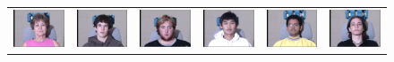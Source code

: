 \newcommand{\tempwidth}[0]{0.9in}
\begin{figure}
\centering
{
\begin{tabular}{@{}c@{}c@{}c@{}c@{}c@{}c@{}}
\hspace{-2mm}\includegraphics[width=\tempwidth,clip=true]{figures_pami/multipie_failed/079_01_01_051_08.png}  &
\includegraphics[width=\tempwidth,clip=true]{figures_pami/multipie_failed/111_01_01_051_08.png}  &
\includegraphics[width=\tempwidth,clip=true]{figures_pami/multipie_failed/196_01_01_051_08.png}  &
\includegraphics[width=\tempwidth,clip=true]{figures_pami/multipie_failed/130_01_01_051_08.png}  &
\includegraphics[width=\tempwidth,clip=true]{figures_pami/multipie_failed/163_01_01_051_08.png}  &
\includegraphics[width=\tempwidth,clip=true]{figures_pami/multipie_failed/175_01_01_051_08.png} \\

\end{tabular}}
\end{figure}
